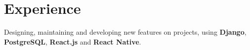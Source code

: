 \documentclass[]{deedy-resume-openfont}
\begin{document}
\begin{minipage}[t]{0.66\textwidth} 


\section{Experience}
\href{https://www.bld.ai/}{}
\vspace{\topsep} %
\begin{tightemize}
\item Designing, maintaining and developing new features on projects, using \textbf{Django}, \textbf{PostgreSQL}, \textbf{React.js} and \textbf{React Native}.
\end{tightemize}
\sectionsep





\end{minipage}
\end{document}
